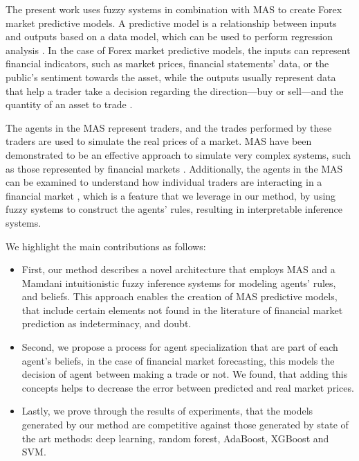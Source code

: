 \documentclass{ieeeaccess}
\begin{document}
The present work uses fuzzy systems in combination with MAS to create
Forex market predictive models. A predictive model is a relationship
between inputs and outputs based on a data model, which can be used to
perform regression analysis \cite{barbieri2004optimal}. In the case of
Forex market predictive models, the inputs can represent financial
indicators, such as market prices, financial statements' data, or the
public's sentiment towards the asset, while the outputs usually
represent data that help a trader take a decision regarding the
direction---buy or sell---and the quantity of an asset to trade
\cite{taveeapiradeecharoen2018dynamic}.

The agents in the MAS represent traders, and the trades performed by
these traders are used to simulate the real prices of a market.  MAS
have been demonstrated to be an effective approach to simulate very
complex systems, such as those represented by financial markets
\cite{Lebaron2001} \cite{Grothmann2002} \cite{Li2014} \cite{Chen2004}
\cite{Kim2018}.  Additionally, the agents in the MAS can be examined
to understand how individual traders are interacting in a financial
market \cite{Wei2014} \cite{Rajab2019}, which is a feature that we
leverage in our method, by using fuzzy systems to construct the
agents' rules, resulting in interpretable inference systems.


We highlight the main contributions as follows: 
\begin{itemize}
  \item First, our method describes a novel architecture that employs MAS and 
  a Mamdani intuitionistic fuzzy inference systems for modeling agents'
  rules, and beliefs. This approach enables the creation of MAS predictive models, 
  that include certain elements not found in the literature of financial market prediction
  as indeterminacy, and doubt.
  
  \item Second, we propose a process for agent specialization that are part of each agent's beliefs,
  in the case of financial market forecasting, this models the decision of agent between 
  making a trade or not. We found, that adding this concepts helps to decrease 
  the error between predicted and real market prices. 
  
  \item Lastly, we prove through the results of experiments, that the models generated by our method are
competitive against those generated by state of the art methods: deep learning, random forest, AdaBoost, XGBoost and SVM.  

\end{itemize}
\end{document}
